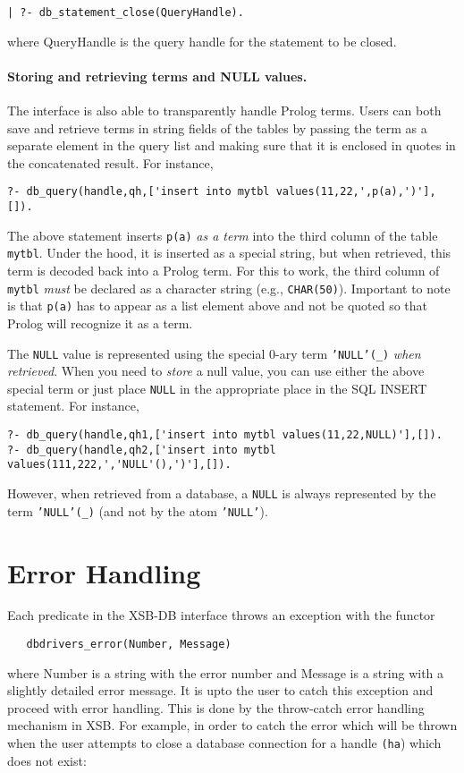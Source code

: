 \begin{verbatim}
| ?- db_statement_close(QueryHandle).
\end{verbatim}

\noindent
where QueryHandle is the query handle for the statement to be closed.

\paragraph{Storing and retrieving terms and NULL values.}
The interface is also able to transparently handle Prolog terms. 
Users can both save and retrieve terms in string fields of the tables
by passing the term as a separate element in the query list and making sure
that it is enclosed in quotes in the concatenated result. For instance,
\begin{verbatim}
?- db_query(handle,qh,['insert into mytbl values(11,22,',p(a),')'],[]).
\end{verbatim}
The above statement inserts \texttt{p(a)} \emph{as a term}
into the third column
of the table \texttt{mytbl}. Under the hood, it is inserted as a special
string, but when retrieved, this term is decoded back into a Prolog
term. For this to work,
the third column of \texttt{mytbl} \emph{must} be declared as a
character string (e.g., \texttt{CHAR(50)}).
Important to note is that \texttt{p(a)} has to appear as a list
element above and not be quoted so that Prolog will recognize it as a term.

The \texttt{NULL}  value is represented using the special 0-ary term
\texttt{'NULL'(\_)} \emph{when retrieved}. When you need to \emph{store} a
null value, you can use either the above special term or just place \texttt{NULL} in the appropriate place in the SQL
INSERT statement. For instance,
\begin{verbatim}
?- db_query(handle,qh1,['insert into mytbl values(11,22,NULL)'],[]).
?- db_query(handle,qh2,['insert into mytbl values(111,222,','NULL'(),')'],[]).
\end{verbatim}
However, when retrieved from a database, a \texttt{NULL} is always
represented by the term \texttt{'NULL'(\_)} (and not by the atom
\texttt{'NULL'}).


\section{Error Handling}

Each predicate in the XSB-DB interface throws an exception with the functor 
\begin{verbatim}
   dbdrivers_error(Number, Message) 
\end{verbatim}
where Number is a string with the 
error number and Message is a string with a slightly detailed error message.
It is upto the user to catch this exception
and proceed with error handling. This is done by the throw-catch error
handling mechanism in XSB. For example, in order to catch the error which
will be thrown when the user attempts to close a database connection for 
a handle {\tt (ha}) which does not exist:

